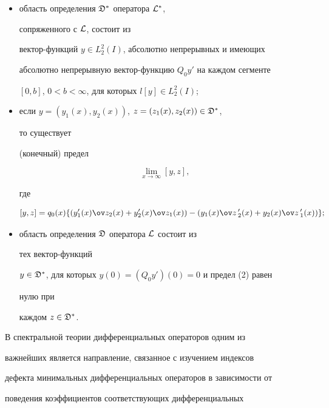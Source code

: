 \begin{itemize} 


\item[I)] область определения $\frak D^*$ оператора $\cal L^*$, 


сопряженного с $\cal L$, состоит из 


вектор-функций $y\in L^2_2(I)$, абсолютно непрерывных и имеющих 


абсолютно непрерывную вектор-функ\-цию $Q_0y'$ на каждом сегменте 


$[0,b]$, $0<b<\infty$, для которых $l[y]\in L^2_2(I)$; 


\item[II)] если $y=(y_1(x),y_2(x))$, $z=(z_1(x),z_2(x))\in\frak D^*$, 


то существует 


(конечный) предел 


\begin{equation} 


\lim_{x\to\infty}[y,z], 


\end{equation} 


где 


\begin{equation} 


[y,z]=q_0(x)\{(y'_1(x)\ov z_2(x)+y'_2(x)\ov z_1(x))- 


(y_1(x)\ov z\,{}'_2(x)+y_2(x)\ov z\,{}'_1(x))\}; 


\end{equation} 


\item[III)] область определения $\frak D$ оператора $\cal L$ состоит из 


тех вектор-функций 


$y\in\frak D^*$, для которых $y(0)=(Q_0y')(0)=0$ и предел (2) равен 


нулю при 


каждом $z\in\frak D^*$. 


\end{itemize} 


 


В спектральной теории дифференциальных операторов одним из 


важнейших является направление, связанное с изучением индексов 


дефекта минимальных дифференциальных операторов в зависимости от 


поведения коэффициентов соответствующих дифференциальных 


